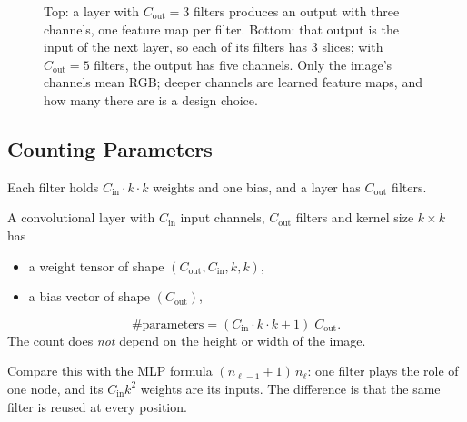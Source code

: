\documentclass[12pt, a4paper]{article}
\begin{document}
\begin{figure}[H]
  \caption{Top: a layer with $C_{\text{out}} = 3$ filters produces an output
    with three channels, one feature map per filter. Bottom: that output is
    the input of the next layer, so each of its filters has $3$ slices; with
    $C_{\text{out}} = 5$ filters, the output has five channels. Only the
    image's channels mean RGB; deeper channels are learned feature maps, and
    how many there are is a design choice.}
  \label{fig:filters}
\end{figure}

\subsection{Counting Parameters}

Each filter holds $C_{\text{in}} \cdot k \cdot k$ weights and one bias, and a
layer has $C_{\text{out}}$ filters.

\begin{resultbox}
  A convolutional layer with $C_{\text{in}}$ input channels, $C_{\text{out}}$
  filters and kernel size $k \times k$ has
  \begin{itemize}[nosep]
    \item a weight tensor of shape $(C_{\text{out}}, C_{\text{in}}, k, k)$,
    \item a bias vector of shape $(C_{\text{out}})$,
  \end{itemize}
  \[
    \#\text{parameters} = (C_{\text{in}} \cdot k \cdot k + 1)\; C_{\text{out}} .
  \]
  The count does \emph{not} depend on the height or width of the image.
\end{resultbox}

Compare this with the MLP formula $(n_{\ell-1} + 1)\,n_\ell$: one filter
plays the role of one node, and its $C_{\text{in}} k^2$ weights are its
inputs. The difference is that the same filter is reused at every position.
\end{document}
